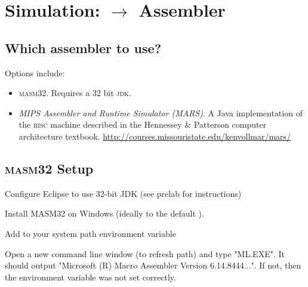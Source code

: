 \chapter{Simulation: \F $\rightarrow$ Assembler}


\section{Which assembler to use?}

Options include:

\begin{itemize}

    \item \textsc{masm32}. Requires a 32 bit \textsc{jdk}.

    \item \emph{MIPS Assembler and Runtime Simulator (MARS)}. A Java
    implementation of the \textsc{risc} machine described in the
    Hennessey \& Patterson computer architecture textbook.
    \url{http://courses.missouristate.edu/kenvollmar/mars/}

\end{itemize}

\section{\textsc{masm32} Setup}

\biTight

\item Configure Eclipse to use 32-bit JDK (see prelab for instructions)

\item Install MASM32 on Windows (ideally to the default ).

\item Add  to your system path environment variable

\item Open a new command line window (to refresh path) and type "ML.EXE". It should output "Microsoft (R) Macro Assembler Version 6.14.8444...". If not, then the environment variable was not set correctly.

